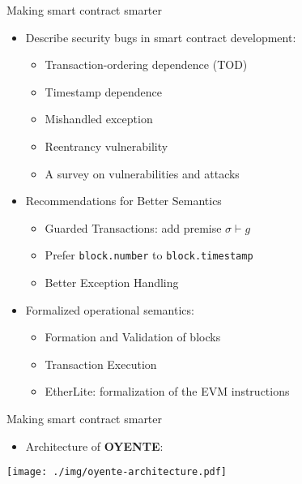 
\begin{frame}{Making smart contract smarter~\cite{luu2016making}}

\begin{itemize}
\item Describe security bugs in smart contract development:
\begin{itemize}
\item Transaction-ordering dependence (TOD)
\item Timestamp dependence
\item Mishandled exception
\item Reentrancy vulnerability
\item A survey on vulnerabilities and attacks~\cite{bib:atzei}
\end{itemize}
\item Recommendations for Better Semantics
\begin{itemize}
\item Guarded Transactions: add premise $\sigma \vdash g$
\item Prefer \texttt{block.number} to \texttt{block.timestamp}
\item Better Exception Handling
\end{itemize}


\item Formalized operational semantics:
\begin{itemize}
\item Formation and Validation of blocks
\item Transaction Execution
\item EtherLite: formalization of the EVM instructions
\end{itemize}
\end{itemize}

\end{frame}

\begin{frame}{Making smart contract smarter~\cite{luu2016making}}
\begin{itemize}
\item Architecture of \textbf{OYENTE}:
\end{itemize}
\begin{center}
	\texttt{[image: ./img/oyente-architecture.pdf]}
\end{center}
\end{frame}

